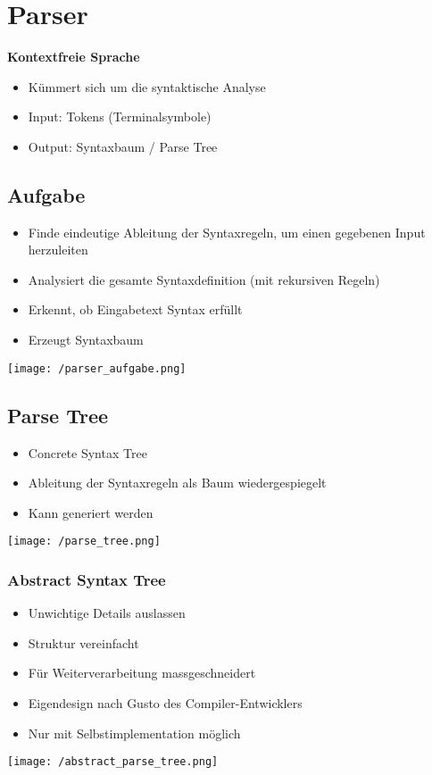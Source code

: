 \section{Parser}
\textbf{Kontextfreie Sprache}
\begin{itemize}
    \item Kümmert sich um die syntaktische Analyse
    \item Input: Tokens (Terminalsymbole)
    \item Output: Syntaxbaum / Parse Tree
\end{itemize}
\subsection{Aufgabe}
\begin{itemize}
    \item Finde eindeutige Ableitung der Syntaxregeln, um einen gegebenen Input herzuleiten
    \item Analysiert die gesamte Syntaxdefinition (mit rekursiven Regeln)
    \item Erkennt, ob Eingabetext Syntax erfüllt
    \item Erzeugt Syntaxbaum
\end{itemize}
\texttt{[image: /parser\_aufgabe.png]} 

\subsection{Parse Tree}
\begin{itemize}
    \item Concrete Syntax Tree
    \item Ableitung der Syntaxregeln als Baum wiedergespiegelt
    \item Kann generiert werden
\end{itemize}
\texttt{[image: /parse\_tree.png]} 

\subsubsection{Abstract Syntax Tree}
\begin{itemize}
    \item Unwichtige Details auslassen
    \item Struktur vereinfacht
    \item Für Weiterverarbeitung massgeschneidert
    \item Eigendesign nach Gusto des Compiler-Entwicklers
    \item Nur mit Selbstimplementation möglich
\end{itemize}
\texttt{[image: /abstract\_parse\_tree.png]} 

